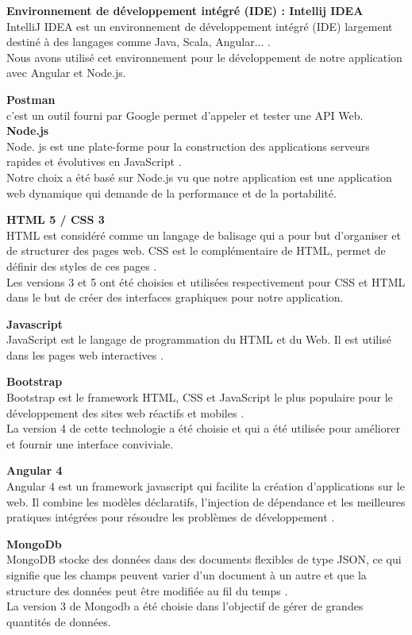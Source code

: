 \textbf{Environnement de développement intégré (IDE) : Intellij IDEA}\\
IntelliJ IDEA est un environnement de développement intégré (IDE) largement destiné à des langages comme Java, Scala, Angular... \cite{IDEA}.
\\Nous avons utilisé cet environnement pour le développement de notre application avec Angular et Node.js.

\textbf{Postman}\\
c’est un outil fourni par Google permet d’appeler et tester une API Web.
\newpage
\textbf{Node.js}\\
Node. js est une plate-forme pour la construction des applications serveurs rapides et évolutives en JavaScript \cite{NodeJs}.\\
Notre choix a été basé sur Node.js vu que notre application est une application web dynamique qui demande de la performance et de la portabilité.

\textbf{HTML 5 / CSS 3}\\
HTML est considéré comme un langage de balisage qui a pour but d'organiser et de structurer des pages web. CSS est le complémentaire de HTML, permet de définir des styles de ces pages \cite{HTMLCSS}.\\
Les versions 3 et 5 ont été choisies et utilisées respectivement pour CSS et HTML dans le but de créer des interfaces graphiques pour notre application.

\textbf{Javascript}\\
JavaScript est le langage de programmation du HTML et du Web. Il est utilisé dans les pages web interactives \cite{JavaScript}. 

\textbf{Bootstrap}\\
Bootstrap est le framework HTML, CSS et JavaScript le plus populaire pour le développement des sites web réactifs et mobiles \cite{BootStrap}.\\
La version 4 de cette technologie a été choisie et qui a été utilisée pour améliorer et fournir une interface conviviale.

\textbf{Angular 4}\\
Angular 4 est un framework javascript qui facilite la création d'applications sur le web. Il combine les modèles déclaratifs, l'injection de dépendance et les meilleures pratiques intégrées pour résoudre les problèmes de développement \cite{Angular}.

\textbf{MongoDb}\\
MongoDB stocke des données dans des documents flexibles de type JSON, ce qui signifie que les champs peuvent varier d'un document à un autre et que la structure des données peut être modifiée au fil du temps \cite{MongoDb}.\\ La version 3 de Mongodb a été choisie dans l'objectif de gérer de grandes quantités de données.

